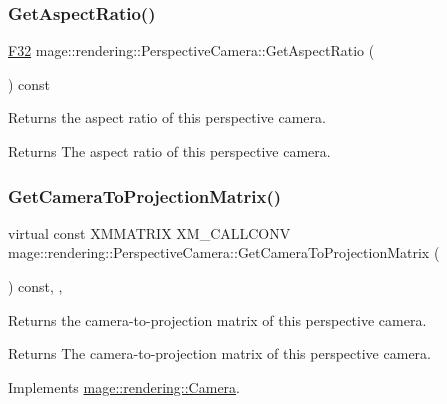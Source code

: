 \subsubsection{\texorpdfstring{Get\+Aspect\+Ratio()}{GetAspectRatio()}}
{\footnotesize\ttfamily \hyperlink{namespacemage_aa97e833b45f06d60a0a9c4fc22ae02c0}{F32} mage\+::rendering\+::\+Perspective\+Camera\+::\+Get\+Aspect\+Ratio (\begin{DoxyParamCaption}{ }\end{DoxyParamCaption}) const\hspace{0.3cm}{\ttfamily [noexcept]}}

Returns the aspect ratio of this perspective camera.

\begin{DoxyReturn}{Returns}
The aspect ratio of this perspective camera. 
\end{DoxyReturn}
\hypertarget{classmage_1_1rendering_1_1_perspective_camera_af0892905a0030fc70bdc629007cde5a0}{}\label{classmage_1_1rendering_1_1_perspective_camera_af0892905a0030fc70bdc629007cde5a0} 
\subsubsection{\texorpdfstring{Get\+Camera\+To\+Projection\+Matrix()}{GetCameraToProjectionMatrix()}}
{\footnotesize\ttfamily virtual const X\+M\+M\+A\+T\+R\+IX X\+M\+\_\+\+C\+A\+L\+L\+C\+O\+NV mage\+::rendering\+::\+Perspective\+Camera\+::\+Get\+Camera\+To\+Projection\+Matrix (\begin{DoxyParamCaption}{ }\end{DoxyParamCaption}) const\hspace{0.3cm}{\ttfamily [override]}, {\ttfamily [virtual]}, {\ttfamily [noexcept]}}

Returns the camera-\/to-\/projection matrix of this perspective camera.

\begin{DoxyReturn}{Returns}
The camera-\/to-\/projection matrix of this perspective camera. 
\end{DoxyReturn}


Implements \hyperlink{classmage_1_1rendering_1_1_camera_a08481175c3718a24333b22176e240d44}{mage\+::rendering\+::\+Camera}.

